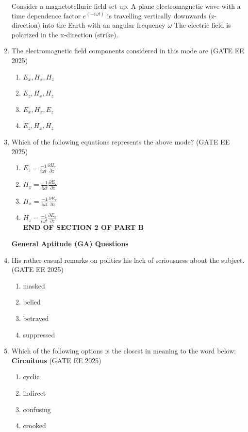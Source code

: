 \documentclass[journal]{IEEEtran}
\begin{document}
\begin{enumerate}[start=26]
Consider a magnetotelluric  field set up. A plane electromagnetic wave with a time dependence factor $e^{(-i\omega t)}$ is travelling vertically downwards (z-direction) into the Earth with an angular frequency $\omega$ The electric field is polarized in the x-direction (strike).
\item The electromagnetic field components considered in this mode are
\hfill{(GATE EE 2025)}
\begin{enumerate}
    \item ${E_x,H_x,H_z}$
    \item ${E_z,H_x,H_z}$
    \item ${E_x,H_x,E_z}$
    \item ${E_z,H_x,H_z}$
\end{enumerate}

\item Which of the following equations represents the above mode?
\hfill{(GATE EE 2025)}
\begin{enumerate}
    \item ${E_z=\frac{-1}{i\omega t}\frac{\partial{H_z}}{\partial z}}$
    \vspace{0.3cm}
    \item ${H_x=\frac{-1}{i\omega t}\frac{\partial{E_z}}{\partial z}}$
      \vspace{0.3cm}
    \item ${H_x=\frac{-1}{i\omega t}\frac{\partial{E_x}}{\partial z}}$
      \vspace{0.3cm}
    \item ${H_z=\frac{-1}{i\omega t}\frac{\partial{E_x}}{\partial z}}$\\
    \vspace{0.5cm}
    \textbf{END OF SECTION 2 OF PART B}
\end{enumerate}
\vspace{3cm}
\textbf{General Aptitude (GA) Questions}
\item His rather casual remarks on politics his lack of seriousness about the subject.\\
\hfill{(GATE EE 2025)}
\begin{enumerate}
    \item  masked
\item  belied
\item  betrayed
\item  suppressed
\end{enumerate}

\item Which of the following options is the closest in meaning to the word below:\\
\textbf{Circuitous}
\hfill{(GATE EE 2025)}
\begin{enumerate}
    \item cyclic
\item  indirect
\item confusing
\item  crooked
\end{enumerate}


\end{enumerate}
\end{document}
